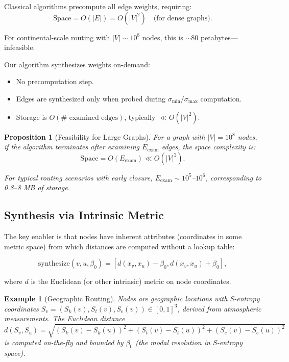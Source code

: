 \documentclass[twocolumn,11pt,a4paper]{article}
\newtheorem{proposition}[theorem]{Proposition}
\newtheorem{example}[theorem]{Example}
\theoremstyle{definition}
\begin{document}
Classical algorithms precompute all edge weights, requiring:
\begin{equation}
\text{Space} = O(|E|) = O(|V|^2) \quad \text{(for dense graphs)}.
\end{equation}

For continental-scale routing with $|V| \sim 10^8$ nodes, this is $\sim 80$ petabytes---infeasible.

Our algorithm synthesizes weights on-demand:
\begin{itemize}
\item No precomputation step.
\item Edges are synthesized only when probed during $\sigma_{\min}/\sigma_{\max}$ computation.
\item Storage is $O(\# \text{ examined edges})$, typically $\ll O(|V|^2)$.
\end{itemize}

\begin{proposition}[Feasibility for Large Graphs]
\label{prop:scaling}
For a graph with $|V| = 10^8$ nodes, if the algorithm terminates after examining $E_{\text{exam}}$ edges, the space complexity is:
\begin{equation}
\text{Space} = O(E_{\text{exam}}) \ll O(|V|^2).
\end{equation}

For typical routing scenarios with early closure, $E_{\text{exam}} \sim 10^5$--$10^6$, corresponding to 0.8--8 MB of storage.
\end{proposition}

\subsection{Synthesis via Intrinsic Metric}

The key enabler is that nodes have inherent attributes (coordinates in some metric space) from which distances are computed without a lookup table:

\begin{equation}
\text{synthesize}(v, u, \beta_0) = [d(x_v, x_u) - \beta_0, d(x_v, x_u) + \beta_0],
\end{equation}

where $d$ is the Euclidean (or other intrinsic) metric on node coordinates.

\begin{example}[Geographic Routing]
Nodes are geographic locations with S-entropy coordinates $S_v = (S_k(v), S_t(v), S_e(v)) \in [0,1]^3$, derived from atmospheric measurements. The Euclidean distance
\begin{equation}
d(S_v, S_u) = \sqrt{(S_k(v) - S_k(u))^2 + (S_t(v) - S_t(u))^2 + (S_e(v) - S_e(u))^2}
\end{equation}
is computed on-the-fly and bounded by $\beta_0$ (the modal resolution in S-entropy space).
\end{example}
\end{document}
